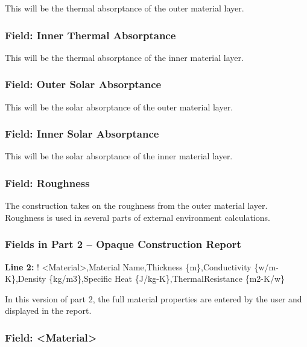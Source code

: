 This will be the thermal absorptance of the outer material layer.

\subsubsection{Field: Inner Thermal Absorptance}\label{field-inner-thermal-absorptance}

This will be the thermal absorptance of the inner material layer.

\subsubsection{Field: Outer Solar Absorptance}\label{field-outer-solar-absorptance}

This will be the solar absorptance of the outer material layer.

\subsubsection{Field: Inner Solar Absorptance}\label{field-inner-solar-absorptance}

This will be the solar absorptance of the inner material layer.

\subsubsection{Field: Roughness}\label{field-roughness}

The construction takes on the roughness from the outer material layer. Roughness is used in several parts of external environment calculations.

\subsubsection{Fields in Part 2 -- Opaque Construction Report}\label{fields-in-part-2-opaque-construction-report}

\textbf{Line 2:} ! \textless{}Material\textgreater{},Material Name,Thickness \{m\},Conductivity \{w/m-K\},Density \{kg/m3\},Specific Heat \{J/kg-K\},ThermalResistance \{m2-K/w\}

In this version of part 2, the full material properties are entered by the user and displayed in the report.

\subsubsection{Field: \textless{}Material\textgreater{}}\label{field-material}

